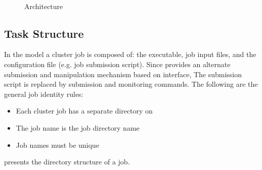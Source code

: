 \begin{figure}[h]
	\centering
	\qquad
	\\
	\caption{\name Architecture}
	\vspace{-.3cm}
	\label{fig:stroll-arch}
\end{figure}

\subsection{\name Task Structure}
\label{sec:task-structure}

In the \name model a cluster job is composed of: the executable, job input files, and the configuration file (e.g. job submission script). Since \name provides an alternate submission and manipulation mechanism based on \fs interface, The submission script is replaced by \name \fs submission and monitoring commands. The following are the general job identity rules:
\begin{itemize}
	\item Each cluster job has a separate directory on \name \fs
	\item The job name is the job directory name
	\item Job names must be unique
\end{itemize}
 presents the directory structure of a \name job.

